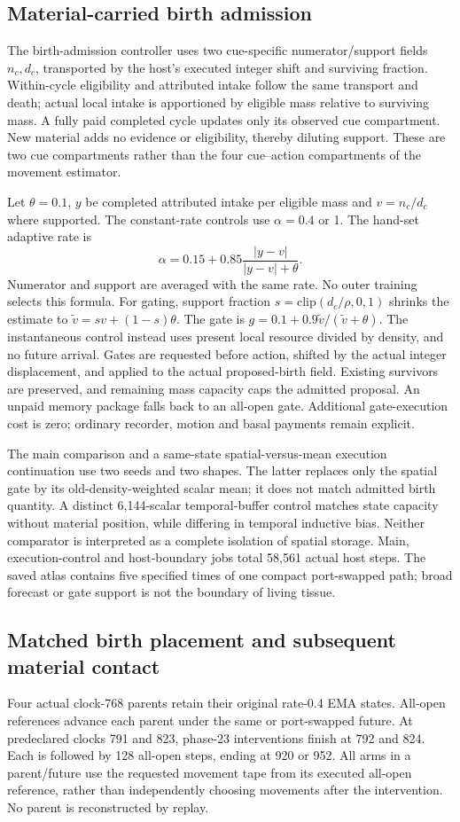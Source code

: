 \subsection*{Material-carried birth admission}
The birth-admission controller uses two cue-specific numerator/support fields $n_c,d_c$, transported by the host's executed integer shift and surviving fraction. Within-cycle eligibility and attributed intake follow the same transport and death; actual local intake is apportioned by eligible mass relative to surviving mass. A fully paid completed cycle updates only its observed cue compartment. New material adds no evidence or eligibility, thereby diluting support. These are two cue compartments rather than the four cue--action compartments of the movement estimator.

Let $\theta=0.1$, $y$ be completed attributed intake per eligible mass and $v=n_c/d_c$ where supported. The constant-rate controls use $\alpha=0.4$ or 1. The hand-set adaptive rate is
\[
\alpha=0.15+0.85\frac{|y-v|}{|y-v|+\theta}.
\]
Numerator and support are averaged with the same rate. No outer training selects this formula. For gating, support fraction $s=\mathrm{clip}(d_c/\rho,0,1)$ shrinks the estimate to $\widetilde v=sv+(1-s)\theta$. The gate is $g=0.1+0.9\widetilde v/(\widetilde v+\theta)$. The instantaneous control instead uses present local resource divided by density, and no future arrival. Gates are requested before action, shifted by the actual integer displacement, and applied to the actual proposed-birth field. Existing survivors are preserved, and remaining mass capacity caps the admitted proposal. An unpaid memory package falls back to an all-open gate. Additional gate-execution cost is zero; ordinary recorder, motion and basal payments remain explicit.

The main comparison and a same-state spatial-versus-mean execution continuation use two seeds and two shapes. The latter replaces only the spatial gate by its old-density-weighted scalar mean; it does not match admitted birth quantity. A distinct 6,144-scalar temporal-buffer control matches state capacity without material position, while differing in temporal inductive bias. Neither comparator is interpreted as a complete isolation of spatial storage. Main, execution-control and host-boundary jobs total 58,561 actual host steps. The saved atlas contains five specified times of one compact port-swapped path; broad forecast or gate support is not the boundary of living tissue.

\subsection*{Matched birth placement and subsequent material contact}
Four actual clock-768 parents retain their original rate-0.4 EMA states. All-open references advance each parent under the same or port-swapped future. At predeclared clocks 791 and 823, phase-23 interventions finish at 792 and 824. Each is followed by 128 all-open steps, ending at 920 or 952. All arms in a parent/future use the requested movement tape from its executed all-open reference, rather than independently choosing movements after the intervention. No parent is reconstructed by replay.

